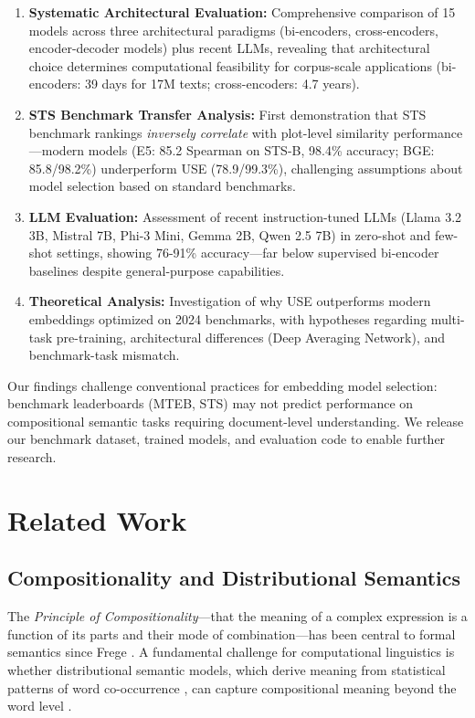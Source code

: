 \documentclass[11pt]{article}
\begin{document}
\begin{enumerate}
    \item \textbf{Systematic Architectural Evaluation:} Comprehensive comparison of 15 models across three architectural paradigms (bi-encoders, cross-encoders, encoder-decoder models) plus recent LLMs, revealing that architectural choice determines computational feasibility for corpus-scale applications (bi-encoders: 39 days for 17M texts; cross-encoders: 4.7 years).

    \item \textbf{STS Benchmark Transfer Analysis:} First demonstration that STS benchmark rankings \textit{inversely correlate} with plot-level similarity performance—modern models (E5: 85.2 Spearman on STS-B, 98.4\% accuracy; BGE: 85.8/98.2\%) underperform USE (78.9/99.3\%), challenging assumptions about model selection based on standard benchmarks.

    \item \textbf{LLM Evaluation:} Assessment of recent instruction-tuned LLMs (Llama 3.2 3B, Mistral 7B, Phi-3 Mini, Gemma 2B, Qwen 2.5 7B) in zero-shot and few-shot settings, showing 76-91\% accuracy—far below supervised bi-encoder baselines despite general-purpose capabilities.

    \item \textbf{Theoretical Analysis:} Investigation of why USE outperforms modern embeddings optimized on 2024 benchmarks, with hypotheses regarding multi-task pre-training, architectural differences (Deep Averaging Network), and benchmark-task mismatch.
\end{enumerate}

Our findings challenge conventional practices for embedding model selection: benchmark leaderboards (MTEB, STS) may not predict performance on compositional semantic tasks requiring document-level understanding. We release our benchmark dataset, trained models, and evaluation code to enable further research.

\section{Related Work}

\subsection{Compositionality and Distributional Semantics}

The \textit{Principle of Compositionality}---that the meaning of a complex expression is a function of its parts and their mode of combination---has been central to formal semantics since Frege \cite{Frege1892,Partee1995}. A fundamental challenge for computational linguistics is whether distributional semantic models, which derive meaning from statistical patterns of word co-occurrence \cite{Harris1954,Firth1957}, can capture compositional meaning beyond the word level \cite{Baroni2014Compositional,Boleda2020Distributional}.
\end{document}
